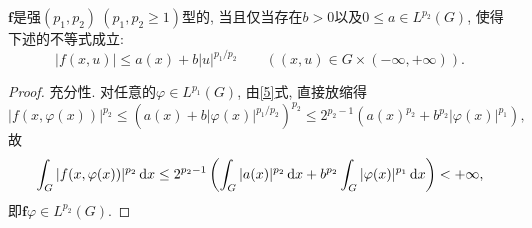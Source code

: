 \begin{proposition}
    $\bm{f}$是强$(p_1, p_2)\ (p_1, p_2 \geq 1)$型的, 当且仅当存在$b > 0$以及$0 \leq a \in L^{p_2}(G)$, 使得下述的不等式成立:
    \begin{equation}\label{5}
        |f(x, u)| \leq a(x) + b|u|^{p_1/p_2} \qquad ((x, u) \in G \times (-\infty, +\infty)).
    \end{equation}
    \begin{proof}
        充分性. 对任意的$\varphi \in L^{p_1}(G)$, 由\eqref{5}式, 直接放缩得 
        \begin{equation*}
            |f(x, \varphi(x))|^{p_2} \leq \left(a(x) + b|\varphi(x)|^{p_1/p_2}\right)^{p_2} \leq 2^{p_2 - 1}(a(x)^{p_2} + b^{p_2}|\varphi(x)|^{p_1}),
        \end{equation*}
        故 
        \begin{equation*}
            \int_G|f(x, \varphi(x))|^{p_2} \,{\rm d}x \leq 2^{p_2 - 1}\left(\int_G|a(x)|^{p_2} \,{\rm d}x + b^{p_2}\int_G|\varphi(x)|^{p_1} \,{\rm d}x\right) < +\infty,
        \end{equation*}
        即$\bm{f}\varphi \in L^{p_2}(G)$.


\end{proof}
\end{proposition}
